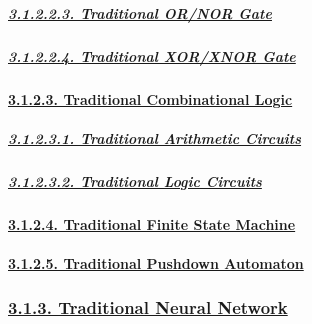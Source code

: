 \documentclass[
]{article}
\begin{document}
\hypertarget{traditional-ornor-gate}{%
\subparagraph{\texorpdfstring{\protect\hyperlink{traditional-ornor-gate-1}{3.1.2.2.3.
Traditional OR/NOR
Gate}}{3.1.2.2.3. Traditional OR/NOR Gate}}\label{traditional-ornor-gate}}

\hypertarget{traditional-xorxnor-gate}{%
\subparagraph{\texorpdfstring{\protect\hyperlink{traditional-xorxnor-gate-1}{3.1.2.2.4.
Traditional XOR/XNOR
Gate}}{3.1.2.2.4. Traditional XOR/XNOR Gate}}\label{traditional-xorxnor-gate}}

\hypertarget{traditional-combinational-logic}{%
\paragraph{\texorpdfstring{\protect\hyperlink{traditional-combinational-logic-1}{3.1.2.3.
Traditional Combinational
Logic}}{3.1.2.3. Traditional Combinational Logic}}\label{traditional-combinational-logic}}

\hypertarget{traditional-arithmetic-circuits}{%
\subparagraph{\texorpdfstring{\protect\hyperlink{traditional-arithmetic-circuits-1}{3.1.2.3.1.
Traditional Arithmetic
Circuits}}{3.1.2.3.1. Traditional Arithmetic Circuits}}\label{traditional-arithmetic-circuits}}

\hypertarget{traditional-logic-circuits}{%
\subparagraph{\texorpdfstring{\protect\hyperlink{traditional-logic-circuits-1}{3.1.2.3.2.
Traditional Logic
Circuits}}{3.1.2.3.2. Traditional Logic Circuits}}\label{traditional-logic-circuits}}

\hypertarget{traditional-finite-state-machine}{%
\paragraph{\texorpdfstring{\protect\hyperlink{traditional-finite-state-machine-1}{3.1.2.4.
Traditional Finite State
Machine}}{3.1.2.4. Traditional Finite State Machine}}\label{traditional-finite-state-machine}}

\hypertarget{traditional-pushdown-automaton}{%
\paragraph{\texorpdfstring{\protect\hyperlink{traditional-pushdown-automaton-1}{3.1.2.5.
Traditional Pushdown
Automaton}}{3.1.2.5. Traditional Pushdown Automaton}}\label{traditional-pushdown-automaton}}

\hypertarget{traditional-neural-network}{%
\subsubsection{\texorpdfstring{\protect\hyperlink{traditional-neural-network-1}{3.1.3.
Traditional Neural
Network}}{3.1.3. Traditional Neural Network}}\label{traditional-neural-network}}
\end{document}

